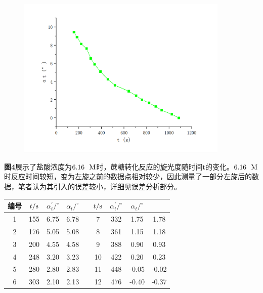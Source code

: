 \documentclass[12pt]{article}
\begin{document}
			\begin{figure}[!h]
				\centering
				\includegraphics[width=0.90\textwidth]{3.png}
			\end{figure}
			\par
			\textbf{图4}展示了盐酸浓度为$6.16\ \ {\rm M}$时，蔗糖转化反应的旋光度随时间t的变化。$6.16\ \ {\rm M}$时反应时间较短，变为左旋之前的数据点相对较少，因此测量了一部分左旋后的数据，笔者认为其引入的误差较小，详细见误差分析部分。\par
			\begin{table}[!h]
				\centering
				\begin{tabular}{ccccccccc}
					\toprule
					编号 & $t/{\rm s}$ & $\alpha^{\prime}_{t}/^{\circ}$ & $\alpha_{t}/^{\circ}$&& $t/{\rm s}$ & $\alpha^{\prime}_{t}/^{\circ}$ & $\alpha_{t}/^{\circ}$\\
					\midrule
					1 & 155 & 6.75 & 6.78 &  & 7  & 332 & 1.75  & 1.78  \\
					2 & 176 & 5.05 & 5.08 &  & 8  & 361 & 1.15  & 1.18  \\
					3 & 200 & 4.55 & 4.58 &  & 9  & 388 & 0.90  & 0.93  \\
					4 & 248 & 3.20 & 3.23 &  & 10 & 422 & 0.20  & 0.23  \\
					5 & 280 & 2.80 & 2.83 &  & 11 & 448 & -0.05 & -0.02 \\
					6 & 303 & 2.10 & 2.13 &  & 12 & 476 & -0.40 & -0.37 \\
					\bottomrule
				\end{tabular}
			\end{table}
\end{document}
